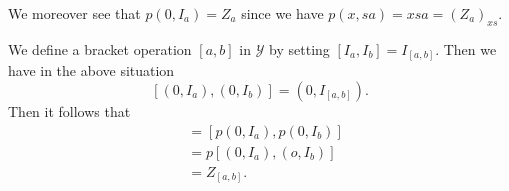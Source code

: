 We moreover see that $p(0, I_a ) = Z_a $ since we have $p (x, sa ) =
 xsa = (Z_a)_{xs}$.  
 
We define a bracket operation $[a , b]$ in $\mathscr{Y}$ by setting
$[I_a , I_b] = I_{[ a, b]}$. Then we have in the above situation  
 $$
 [ (0, I_a) , (0, I_b)] = (0, I_{[a, b]}). 
 $$
 Then it follows that 
\begin{align*}
  [Z_a , Z_b] & = [ p (0, I_a) , p (0, I_b)]\\
  & = p [ (0, I_a) , (o, I_b)]\\
  & = Z_{ [ a , b]}. 
\end{align*} 

